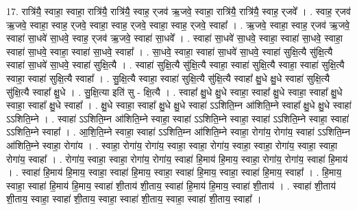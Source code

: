 \documentclass[17pt]{extarticle}
\begin{document}
17. रात्रि॑यै॒ स्वाहा॒ स्वाहा॒ रात्रि॑यै॒ रात्रि॑यै॒ स्वाह॒ र्‌जव॑ ऋ॒जवे॒ स्वाहा॒ रात्रि॑यै॒ रात्रि॑यै॒ स्वाह॒ र्‌जवे᳚ । . स्वाह॒ र्‌जव॑ ऋ॒जवे॒ स्वाहा॒ स्वाह॒ र्‌जवे॒ स्वाहा॒ स्वाह॒ र्‌जवे॒ स्वाहा॒ स्वाह॒ र्‌जवे॒ स्वाहा᳚ । . ऋ॒जवे॒ स्वाहा॒ स्वाह॒ र्‌जव॑ ऋ॒जवे॒ स्वाहा॑ सा॒धवे॑ सा॒धवे॒ स्वाह॒ र्‌जव॑ ऋ॒जवे॒ स्वाहा॑ सा॒धवे᳚ । . स्वाहा॑ सा॒धवे॑ सा॒धवे॒ स्वाहा॒ स्वाहा॑ सा॒धवे॒ स्वाहा॒ स्वाहा॑ सा॒धवे॒ स्वाहा॒ स्वाहा॑ सा॒धवे॒ स्वाहा᳚ । . सा॒धवे॒ स्वाहा॒ स्वाहा॑ सा॒धवे॑ सा॒धवे॒ स्वाहा॑ सुक्षि॒त्यै सु॑क्षि॒त्यै स्वाहा॑ सा॒धवे॑ सा॒धवे॒ स्वाहा॑ सुक्षि॒त्यै । . स्वाहा॑ सुक्षि॒त्यै सु॑क्षि॒त्यै स्वाहा॒ स्वाहा॑ सुक्षि॒त्यै स्वाहा॒ स्वाहा॑ सुक्षि॒त्यै स्वाहा॒ स्वाहा॑ सुक्षि॒त्यै स्वाहा᳚ । . सु॒क्षि॒त्यै स्वाहा॒ स्वाहा॑ सुक्षि॒त्यै सु॑क्षि॒त्यै स्वाहा᳚ क्षु॒धे क्षु॒धे स्वाहा॑ सुक्षि॒त्यै सु॑क्षि॒त्यै स्वाहा᳚ क्षु॒धे । . सु॒क्षि॒त्या इति॑ सु - क्षि॒त्यै । . स्वाहा᳚ क्षु॒धे क्षु॒धे स्वाहा॒ स्वाहा᳚ क्षु॒धे स्वाहा॒ स्वाहा᳚ क्षु॒धे स्वाहा॒ स्वाहा᳚ क्षु॒धे स्वाहा᳚ । . क्षु॒धे स्वाहा॒ स्वाहा᳚ क्षु॒धे क्षु॒धे स्वाहा॑ ऽऽशिति॒म्न आ॑शिति॒म्ने स्वाहा᳚ क्षु॒धे क्षु॒धे स्वाहा॑ ऽऽशिति॒म्ने । . स्वाहा॑ ऽऽशिति॒म्न आ॑शिति॒म्ने स्वाहा॒ स्वाहा॑ ऽऽशिति॒म्ने स्वाहा॒ स्वाहा॑ ऽऽशिति॒म्ने स्वाहा॒ स्वाहा॑ ऽऽशिति॒म्ने स्वाहा᳚ । . आ॒शि॒ति॒म्ने स्वाहा॒ स्वाहा॑ ऽऽशिति॒म्न आ॑शिति॒म्ने स्वाहा॒ रोगा॑य॒ रोगा॑य॒ स्वाहा॑ ऽऽशिति॒म्न आ॑शिति॒म्ने स्वाहा॒ रोगा॑य । . स्वाहा॒ रोगा॑य॒ रोगा॑य॒ स्वाहा॒ स्वाहा॒ रोगा॑य॒ स्वाहा॒ स्वाहा॒ रोगा॑य॒ स्वाहा॒ स्वाहा॒ रोगा॑य॒ स्वाहा᳚ । . रोगा॑य॒ स्वाहा॒ स्वाहा॒ रोगा॑य॒ रोगा॑य॒ स्वाहा॑ हि॒माय॑ हि॒माय॒ स्वाहा॒ रोगा॑य॒ रोगा॑य॒ स्वाहा॑ हि॒माय॑ । . स्वाहा॑ हि॒माय॑ हि॒माय॒ स्वाहा॒ स्वाहा॑ हि॒माय॒ स्वाहा॒ स्वाहा॑ हि॒माय॒ स्वाहा॒ स्वाहा॑ हि॒माय॒ स्वाहा᳚ । . हि॒माय॒ स्वाहा॒ स्वाहा॑ हि॒माय॑ हि॒माय॒ स्वाहा॑ शी॒ताय॑ शी॒ताय॒ स्वाहा॑ हि॒माय॑ हि॒माय॒ स्वाहा॑ शी॒ताय॑ । . स्वाहा॑ शी॒ताय॑ शी॒ताय॒ स्वाहा॒ स्वाहा॑ शी॒ताय॒ स्वाहा॒ स्वाहा॑ शी॒ताय॒ स्वाहा॒ स्वाहा॑ शी॒ताय॒ स्वाहा᳚ । \newline
\end{document}
